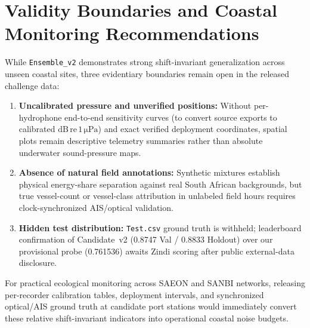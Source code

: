 \documentclass[10pt,a4paper]{article}
\begin{document}
\section{Validity Boundaries and Coastal Monitoring Recommendations}
While \texttt{Ensemble\_v2} demonstrates strong shift-invariant generalization across unseen coastal sites, three evidentiary boundaries remain open in the released challenge data:
\begin{enumerate}
    \item \textbf{Uncalibrated pressure and unverified positions:} Without per-hydrophone end-to-end sensitivity curves (to convert source exports to calibrated $\mathrm{dB\,re\,1\,\mu Pa}$) and exact verified deployment coordinates, spatial plots remain descriptive telemetry summaries rather than absolute underwater sound-pressure maps.
    \item \textbf{Absence of natural field annotations:} Synthetic mixtures establish physical energy-share separation against real South African backgrounds, but true vessel-count or vessel-class attribution in unlabeled field hours requires clock-synchronized AIS/optical validation.
    \item \textbf{Hidden test distribution:} \texttt{Test.csv} ground truth is withheld; leaderboard confirmation of Candidate~v2 (0.8747 Val / 0.8833 Holdout) over our provisional probe (0.761536) awaits Zindi scoring after public external-data disclosure.
\end{enumerate}
For practical ecological monitoring across SAEON and SANBI networks, releasing per-recorder calibration tables, deployment intervals, and synchronized optical/AIS ground truth at candidate port stations would immediately convert these relative shift-invariant indicators into operational coastal noise budgets.
\end{document}
